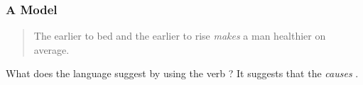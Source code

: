 \documentclass[slides]{beamer} %
\begin{document}
\begin{frame}\frametitle{A  Model}

\begin{quotation}
The earlier to bed and the earlier to rise \emph{makes} a man healthier on average.
\end{quotation}

What does the language suggest by using the verb ? It suggests that the  \textit{causes} .
	
\end{frame}

\begin{frame}\frametitle{}

	
\end{frame}

\begin{frame}\frametitle{}

	
\end{frame}

\begin{frame}\frametitle{}

	
\end{frame}

\begin{frame}\frametitle{}

	
\end{frame}

\begin{frame}\frametitle{}

	
\end{frame}

\begin{frame}\frametitle{}

	
\end{frame}

\begin{frame}\frametitle{}

	
\end{frame}
\end{document}
